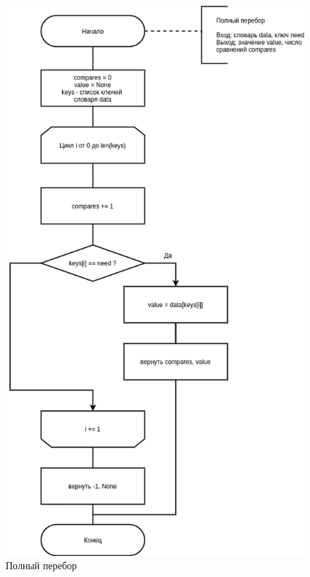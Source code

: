 \begin{figure}[H]
	\begin{center}
		\includegraphics[scale=0.6]{img/brute_force.png}
	\end{center}
	\captionsetup{justification=centering}
	\caption{Полный перебор}
	\label{img:brute}
\end{figure}

